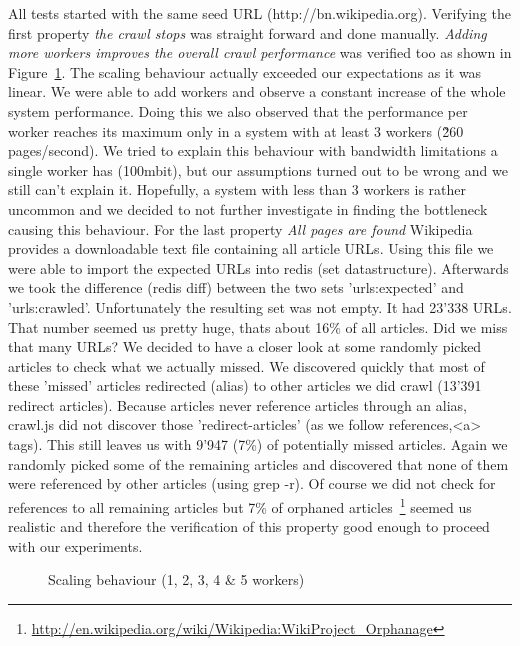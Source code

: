 All tests started with the same seed URL (http://bn.wikipedia.org). Verifying the first property \emph{the crawl stops} was straight forward and done manually. \emph{Adding more workers improves the overall crawl performance} was verified too as shown in Figure~\ref{plot:exp_001}. The scaling behaviour actually exceeded our expectations as it was linear. We were able to add workers and observe a constant increase of the whole system performance. Doing this we also observed that the performance per worker reaches its maximum only in a system with at least 3 workers (\~260 pages/second). We tried to explain this behaviour with bandwidth limitations a single worker has (100mbit), but our assumptions turned out to be wrong and we still can't explain it. Hopefully, a system with less than 3 workers is rather uncommon and we decided to not further investigate in finding the bottleneck causing this behaviour.
\newline
\newline
For the last property \emph{All pages are found} Wikipedia provides a downloadable text file containing all article URLs. Using this file we were able to import the expected URLs into redis (set datastructure). Afterwards we took the difference (redis diff) between the two sets 'urls:expected' and 'urls:crawled'. Unfortunately the resulting set was not empty. It had 23'338 URLs. That number seemed us pretty huge, thats about 16\% of all articles. Did we miss that many URLs? We decided to have a closer look at some randomly picked articles to check what we actually missed. We discovered quickly that most of these 'missed' articles redirected (alias) to other articles we did crawl (13'391 redirect articles). Because articles never reference articles through an alias, crawl.js did not discover those 'redirect-articles' (as we follow references,<a> tags). This still leaves us with 9'947 (7\%) of potentially missed articles. Again we randomly picked some of the remaining articles and discovered that none of them were referenced by other articles (using grep -r). Of course we did not check for references to all remaining articles but 7\% of orphaned articles~\footnote{\url{http://en.wikipedia.org/wiki/Wikipedia:WikiProject_Orphanage}} seemed us realistic and therefore the verification of this property good enough to proceed with our experiments.
\newline
\newline
\begin{figure}
\centering
\caption{Scaling behaviour (1, 2, 3, 4 \& 5 workers)}
\label{plot:exp_001}
\end{figure}

